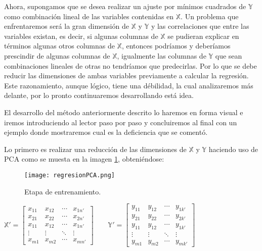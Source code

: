 Ahora, supongamos que se desea realizar un ajuste por mínimos cuadrados de $\mathbb{Y}$ como combinación lineal de las variables contenidas en $\mathbb{X}$. Un problema que enfrentaremos será la gran dimensión de $\mathbb{X}$ y $\mathbb{Y}$ y las correlaciones que entre las variables existan, es decir, si algunas columnas de $\mathbb{X}$ se pudieran explicar en términos algunas otros columnas de $\mathbb{X}$, entonces podríamos y deberíamos prescindir de algunas columnas de $\mathbb{X}$, igualmente las columnas de $\mathbb{Y}$ que sean combinaciones lineales de otras no tendríamos que predecirlas. Por lo que se debe reducir las dimensiones de ambas variables previamente a calcular la regresión. Este razonamiento, aunque lógico, tiene una débilidad, la cual analizaremos más delante, por lo pronto continuaremos desarrollando está idea. 

El desarrollo del método anteriormente descrito lo haremos en forma visual e iremos introduciendo al lector paso por paso y concluiremos al final con un ejemplo donde mostraremos cual es la deficiencia que se comentó.

Lo primero es realizar una reducción de las dimensiones de $\mathbb{X}$ y $\mathbb{Y}$ haciendo uso de PCA como se muesta en la imagen \ref{red}, obteniéndose: 
 
\begin{figure}
\centering
\texttt{[image: regresionPCA.png]}
\caption{Etapa de entrenamiento.}\label{red}
\end{figure}
 
$
\mathbb{X'} =
\begin{bmatrix}
 x_{11} & x_{12} & \cdots & x_{1n'} \\
 x_{21} & x_{22} & \cdots & x_{2n'} \\
 x_{11} & x_{12} & \cdots & x_{1n'} \\
 \vdots & \vdots & \ddots & \vdots \\
 x_{m1} & x_{m2} & \cdots & x_{mn'}	
\end{bmatrix} 
\qquad
\mathbb{Y'} =
\begin{bmatrix}
 y_{11} & y_{12} & \cdots & y_{1k'} \\
 y_{21} & y_{22} & \cdots & y_{2k'} \\
 y_{11} & y_{12} & \cdots & y_{1k'} \\
 \vdots & \vdots & \ddots & \vdots \\
 y_{m1} & y_{m2} & \cdots & y_{mk'}	
\end{bmatrix} $ 

